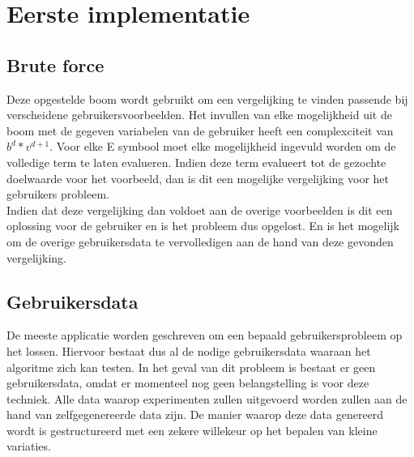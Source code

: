 \documentclass[Main.tex]{subfiles}
\begin{document}
\section{Eerste implementatie}
\subsection{Brute force}
Deze opgestelde boom wordt gebruikt om een vergelijking te vinden passende bij verscheidene gebruikersvoorbeelden. Het invullen van elke mogelijkheid uit de boom met de gegeven variabelen van de gebruiker heeft een complexciteit van $b^{d}*v^{d+1}$. Voor elke E symbool moet elke mogelijkheid ingevuld worden om de volledige term te laten evalueren. Indien deze term evalueert tot de gezochte doelwaarde voor het voorbeeld, dan is dit een mogelijke vergelijking voor het gebruikers probleem. \\
Indien dat deze vergelijking dan voldoet aan de overige voorbeelden is dit een oplossing voor de gebruiker en is het probleem dus opgelost. En is het mogelijk om de overige gebruikersdata te vervolledigen aan de hand van deze gevonden vergelijking.

\subsection{Gebruikersdata}
De meeste applicatie worden geschreven om een bepaald gebruikersprobleem op het lossen. Hiervoor bestaat dus al de nodige gebruikersdata waaraan het algoritme zich kan testen. In het geval van dit probleem is bestaat er geen gebruikersdata, omdat er momenteel nog geen belangstelling is voor deze techniek. Alle data waarop experimenten zullen uitgevoerd worden zullen aan de hand van zelfgegenereerde data zijn. De manier waarop deze data genereerd wordt is gestructureerd met een zekere willekeur op het bepalen van kleine variaties.
\end{document}
